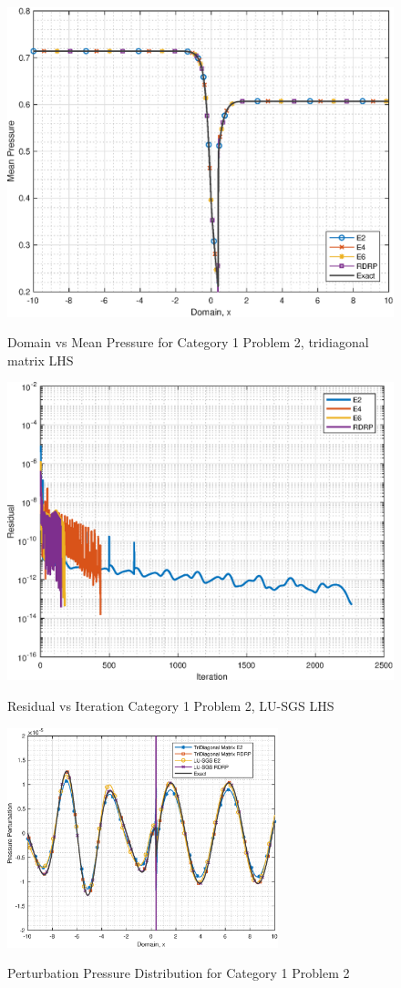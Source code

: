 \documentclass[conf]{new-aiaa}
\begin{document}
\begin{figure}[hbtp!]
	\centering
	{\includegraphics[width=.7\textwidth]{Figures/TriDi_C1P2}}
	\caption{Domain vs Mean Pressure for Category 1 Problem 2, tridiagonal matrix LHS}
	\label{fig:TriDi_C1P2}
\end{figure}

\begin{figure}[hbtp!]
	\centering
	{\includegraphics[width=.7\textwidth]{Figures/C1P2_LUSGS_ROC}}
	\caption{Residual vs Iteration Category 1 Problem 2, LU-SGS LHS}
	\label{fig:LUSGS_C1P2_ROC}
\end{figure}

\begin{figure}[hbtp!]
	\centering
	{\includegraphics[width=0.7\textwidth]{Figures/Instantaneous_C1P2}}
	\caption{Perturbation Pressure Distribution for Category 1 Problem 2}
	\label{fig:Unsteady_C1P2}
\end{figure}
\end{document}
